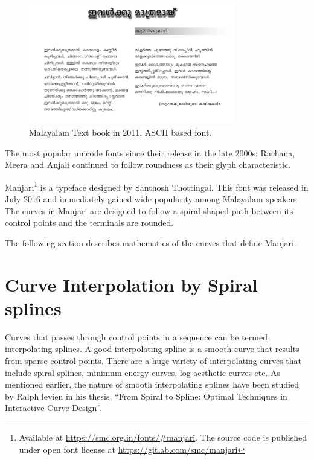 \documentclass[10pt]{article}
\begin{document}
\begin{figure}
	\centering
	\includegraphics[width=0.8\textwidth]{images/2011-Malayalam-Textbook.png}
	\caption{Malayalam Text book in 2011. ASCII based font.}
	\label{maltextbook}
\end{figure}

 
 The most popular unicode fonts since their release in the late 2000s: Rachana, Meera and Anjali continued to follow roundness as their glyph characteristic. 

Manjari\footnote{Available at \url{https://smc.org.in/fonts/\#manjari}. The source code is published under open font license at \url{https://gitlab.com/smc/manjari}} is a typeface designed by Santhosh Thottingal. This font was released in July 2016 and immediately gained wide popularity among Malayalam speakers. The curves in Manjari are designed to follow a spiral shaped path between its control points and the terminals are rounded. %

 
 The following section describes mathematics of the curves that define Manjari. 
 


\section{Curve Interpolation by Spiral splines}

Curves that passes through control points in a sequence can be termed interpolating splines. A good interpolating spline is a smooth curve that results from sparse control points. There are a huge variety of interpolating curves that include spiral splines, minimum energy curves, log aesthetic curves etc. As mentioned earlier, the nature of smooth interpolating splines have been studied by Ralph levien in his thesis, ``From Spiral to Spline: Optimal Techniques in Interactive Curve Design”\cite{levien}.
\end{document}

